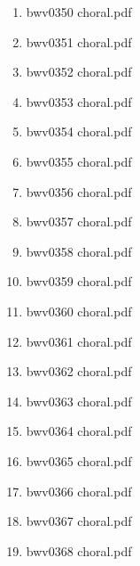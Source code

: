 \documentclass[11pt]{article}
\begin{document}
\begin{enumerate}
\begin{enumerate}
\begin{enumerate}
\begin{enumerate}
\item bwv0350 choral.pdf
\label{sec-1-1-1-1-44-6-7-2-4-99}

\item bwv0351 choral.pdf
\label{sec-1-1-1-1-44-6-7-2-4-100}

\item bwv0352 choral.pdf
\label{sec-1-1-1-1-44-6-7-2-4-101}

\item bwv0353 choral.pdf
\label{sec-1-1-1-1-44-6-7-2-4-102}

\item bwv0354 choral.pdf
\label{sec-1-1-1-1-44-6-7-2-4-103}

\item bwv0355 choral.pdf
\label{sec-1-1-1-1-44-6-7-2-4-104}

\item bwv0356 choral.pdf
\label{sec-1-1-1-1-44-6-7-2-4-105}

\item bwv0357 choral.pdf
\label{sec-1-1-1-1-44-6-7-2-4-106}

\item bwv0358 choral.pdf
\label{sec-1-1-1-1-44-6-7-2-4-107}

\item bwv0359 choral.pdf
\label{sec-1-1-1-1-44-6-7-2-4-108}

\item bwv0360 choral.pdf
\label{sec-1-1-1-1-44-6-7-2-4-109}

\item bwv0361 choral.pdf
\label{sec-1-1-1-1-44-6-7-2-4-110}

\item bwv0362 choral.pdf
\label{sec-1-1-1-1-44-6-7-2-4-111}

\item bwv0363 choral.pdf
\label{sec-1-1-1-1-44-6-7-2-4-112}

\item bwv0364 choral.pdf
\label{sec-1-1-1-1-44-6-7-2-4-113}

\item bwv0365 choral.pdf
\label{sec-1-1-1-1-44-6-7-2-4-114}

\item bwv0366 choral.pdf
\label{sec-1-1-1-1-44-6-7-2-4-115}

\item bwv0367 choral.pdf
\label{sec-1-1-1-1-44-6-7-2-4-116}

\item bwv0368 choral.pdf
\label{sec-1-1-1-1-44-6-7-2-4-117}


\end{enumerate}
\end{enumerate}
\end{enumerate}
\end{enumerate}
\end{document}
